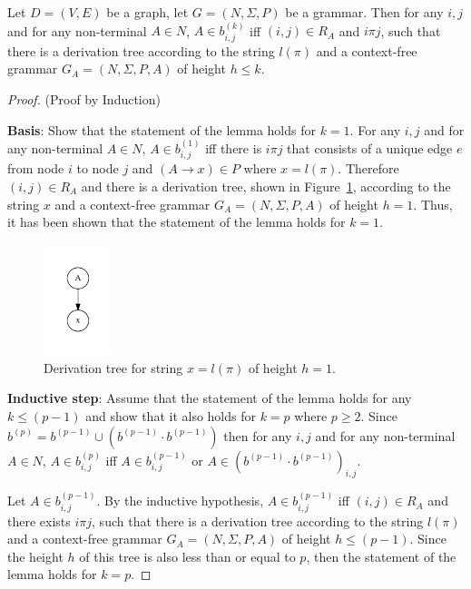 \begin{lemma}
Let $D = (V,E)$ be a graph, let $G =(N,\Sigma,P)$ be a grammar. Then for any $i, j$ and for any non-terminal $A \in N$, $A \in b^{(k)}_{i,j}$ iff $(i,j) \in R_A$ and $i \pi j$, such that there is a derivation tree according to the string $l(\pi)$ and a context-free grammar $G_A = (N,\Sigma,P,A)$ of height $h \leq k$.
\end{lemma}
\begin{proof}(Proof by Induction)

\textbf{Basis}: Show that the statement of the lemma holds for $k = 1$. For any $i, j$ and for any non-terminal $A \in N$, $A \in b^{(1)}_{i,j}$ iff there is $i \pi j$ that consists of a unique edge $e$ from node $i$ to node $j$ and $(A \rightarrow x) \in P$ where $x = l(\pi)$. Therefore $(i,j) \in R_A$ and there is a derivation tree, shown in Figure~\ref{tree1}, according to the string $x$ and a context-free grammar $G_A = (N,\Sigma,P,A)$ of height $h = 1$. Thus, it has been shown that the statement of the lemma holds for $k = 1$.

\begin{figure}[h!]
 \centering
 \includegraphics[width=2cm]{pictures/tree1.pdf}
 \caption{Derivation tree for string $x = l(\pi)$ of height $h = 1$.}
 \label{tree1}
\end{figure}

\textbf{Inductive step}: Assume that the statement of the lemma holds for any $k \leq (p - 1)$ and show that it also holds for $k = p$ where $p \geq 2$. Since $b^{(p)} = b^{(p-1)} \cup (b^{(p-1)} \cdot b^{(p-1)})$ then for any $i, j$ and for any non-terminal $A \in N$, $A \in b^{(p)}_{i,j}$ iff $A \in b^{(p-1)}_{i,j}$ or $A \in (b^{(p-1)} \cdot b^{(p-1)})_{i,j}$.

Let $A \in b^{(p-1)}_{i,j}$. By the inductive hypothesis, $A \in b^{(p-1)}_{i,j}$ iff $(i,j) \in R_A$ and there exists $i \pi j$, such that there is a derivation tree according to the string $l(\pi)$ and a context-free grammar $G_A = (N,\Sigma,P,A)$ of height $h \leq (p-1)$. Since the height $h$ of this tree is also less than or equal to $p$, then the statement of the lemma holds for $k = p$.


\end{proof}
